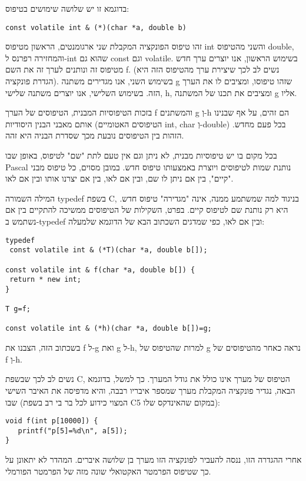       בדוגמא זו יש שלושה שימושים בטיפוס:

\begin{verbatim}
const volatile int & (*)(char *a, double b)
\end{verbatim}

      זהו טיפוס הפונקציה המקבלת שני ארגומנטים, הראשון מטיפוס int והשני מהטיפוס double, והמחזירה רפרנס ל-int שהוא גם const וגם volatile. בשימוש הראשון, אנו יוצרים ערך חדש מטיפוס זה ונותנים לערך זה את השם f. (נשים לב לכך שיצירת ערך מהטיפוס הזה היא הגדרת פונקציה). בשימוש השני, אנו מגדירים משתנה g שזהו טיפוסו, ומציבים לו את הערך הזה. בשימוש השלישי, אנו יוצרים משתנה שלישי, h, ומציבים את תכנו של המשתנה g אליו.

      בזכות הטיפוסיות המבנית, הטיפוסים של הערך f והמשתנים g וְ-h הם זהים, על אף שבנינו אותם מאבני הבנין היסודיות (הטיפוסים האטומיים int, char וְ-double) בכל פעם מחדש. הזהות בין הטיפוסים נובעת מכך שסדרת הבניה היא זהה.

      בכל מקום בו יש טיפוסיות מבנית, לא ניתן וגם אין טעם לתת "שם" לטיפוס, באופן שבו Pascal נותנת שמות לטיפוסים ויוצרת באמצעותו טיפוס חדש. במובן מסוים, כל טיפוס מבני "קיים", בין אם ניתן לו שם, ובין אם לאו, בין אם יצרנו אותו ובין אם לאו.

      המילה השמורה typedef בשפת C, בניגוד למה שמשתמע ממנה, אינה "מגדירה" טיפוס חדש. היא רק נותנת שם לטיפוס קיים. בפרט, השקילות של הטיפוסים ממשיכה להתקיים בין אם נשתמש ב-typedef ובין אם לאו, כפי שמדגים השכתוב הבא של הדוגמא שלמעלה:

\begin{verbatim}
typedef
 const volatile int & (*T)(char *a, double b[]);

const volatile int & f(char *a, double b[]) {
 return * new int;
}

T g=f;

const volatile int & (*h)(char *a, double b[])=g;
\end{verbatim}

      בשכתוב הזה, הצבנו את f ל-g ואת g ל-h, למרות שהטיפוס של g נראה כאחר מהטיפוסים של f וְ-h.

      נשים לב לכך שבשפת C, הטיפוס של מערך אינו כולל את גודל המערך. כך למשל, בדוגמא הבאה, נגדיר פונקציה המקבלת מערך שמספר איבריו רבבה, והיא מדפיסה את האיבר השישי שבו (המצוי כידוע לכל בר בי רב בשפת Cבמקום שהאינדקס שלו 5):

\begin{verbatim}
void f(int p[10000]) {
   printf("p[5]=%d\n", a[5]);
}
\end{verbatim}

      אחרי ההגדרה הזו, ננסה להעביר לפונקציה הזו מערך בן שלושה איברים. המהדר לא יתאונן על כך שטיפוס הפרמטר האקטואלי שונה מזה של הפרמטר הפורמלי.

